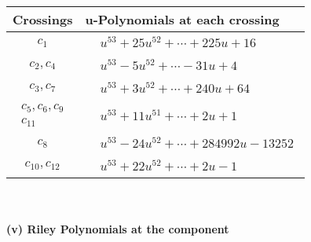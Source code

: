 \documentclass[1p]{elsarticle_modified}
\theoremstyle{definition}
\begin{document}
\begin{tabular}{m{50pt}|m{274pt}}
Crossings & \hspace{64pt}u-Polynomials at each crossing \\
\hline $$\begin{aligned}c_{1}\end{aligned}$$&$\begin{aligned}
&u^{53}+25 u^{52}+\cdots+225 u+16
\end{aligned}$\\
\hline $$\begin{aligned}c_{2},c_{4}\end{aligned}$$&$\begin{aligned}
&u^{53}-5 u^{52}+\cdots-31 u+4
\end{aligned}$\\
\hline $$\begin{aligned}c_{3},c_{7}\end{aligned}$$&$\begin{aligned}
&u^{53}+3 u^{52}+\cdots+240 u+64
\end{aligned}$\\
\hline $$\begin{aligned}c_{5},c_{6},c_{9}\\c_{11}\end{aligned}$$&$\begin{aligned}
&u^{53}+11 u^{51}+\cdots+2 u+1
\end{aligned}$\\
\hline $$\begin{aligned}c_{8}\end{aligned}$$&$\begin{aligned}
&u^{53}-24 u^{52}+\cdots+284992 u-13252
\end{aligned}$\\
\hline $$\begin{aligned}c_{10},c_{12}\end{aligned}$$&$\begin{aligned}
&u^{53}+22 u^{52}+\cdots+2 u-1
\end{aligned}$\\
\hline
\end{tabular}\\~\\
\newpage\renewcommand{\arraystretch}{1}
\flushleft \textbf{(v) Riley Polynomials at the component}\newline \\
\end{document}
